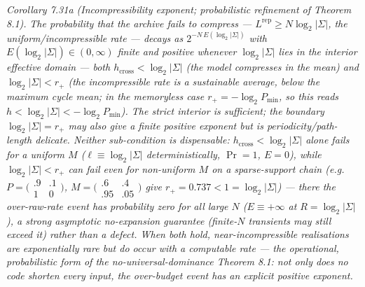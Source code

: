 \documentclass[
]{article}
\begin{document}
\emph{Corollary 7.31a (Incompressibility exponent; probabilistic refinement of
Theorem 8.1).} \emph{The probability that the archive fails to compress ---
$L^{\mathrm{rep}}\ge N\log_2|\Sigma|$, the uniform/incompressible rate --- decays as
$2^{-N\,E(\log_2|\Sigma|)}$ with $E(\log_2|\Sigma|)\in(0,\infty)$ finite and positive
\emph{whenever} $\log_2|\Sigma|$ lies in the interior effective domain --- both
$h_{\mathrm{cross}}<\log_2|\Sigma|$ (the model compresses in the mean) \emph{and}
$\log_2|\Sigma|<r_+$ (the incompressible rate is a \emph{sustainable} average, below the
maximum cycle mean; in the memoryless case $r_+=-\log_2 P_{\min}$, so this reads
$h<\log_2|\Sigma|<-\log_2 P_{\min}$). The strict interior is \emph{sufficient}; the
boundary $\log_2|\Sigma|=r_+$ may also give a finite positive exponent but is
periodicity/path-length delicate. Neither sub-condition is dispensable:
$h_{\mathrm{cross}}<\log_2|\Sigma|$ alone fails for a uniform $M$
($\ell\equiv\log_2|\Sigma|$ deterministically, $\Pr=1$, $E=0$), while
$\log_2|\Sigma|<r_+$ can fail \emph{even for non-uniform $M$} on a sparse-support chain
(e.g.\ $P=\bigl(\begin{smallmatrix}.9&.1\\1&0\end{smallmatrix}\bigr)$,
$M=\bigl(\begin{smallmatrix}.6&.4\\.95&.05\end{smallmatrix}\bigr)$ give
$r_+=0.737<1=\log_2|\Sigma|$) --- there the over-raw-rate event has probability zero
for all large $N$ ($E\equiv+\infty$ at $R=\log_2|\Sigma|$), a strong \emph{asymptotic}
no-expansion guarantee (finite-$N$ transients may still exceed it) rather than a defect. When both hold, near-incompressible realisations are exponentially
rare but do occur with a computable rate --- the operational, probabilistic form of the
no-universal-dominance Theorem 8.1: not only does no code shorten \emph{every}
input, the over-budget event has an explicit positive exponent.}
\end{document}
